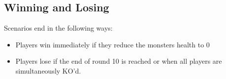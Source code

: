 \documentclass[12pt]{article}
\newenvironment{itemizeCustom}
{\begin{itemize}
  \setlength{\itemsep}{1pt}
  \setlength{\parskip}{0pt}
  \setlength{\parsep}{0pt}}
{\end{itemize}}
\begin{document}
\begin{multicols*}{2}
\subsection*{Winning and Losing}
Scenarios end in the following ways:
    \begin{itemizeCustom}
        \item Players win immediately if they reduce the monsters health to 0
        \item Players lose if the end of round 10 is reached or when all players are simultaneously KO'd.
    \end{itemizeCustom}

\end{multicols*}
\end{document}
